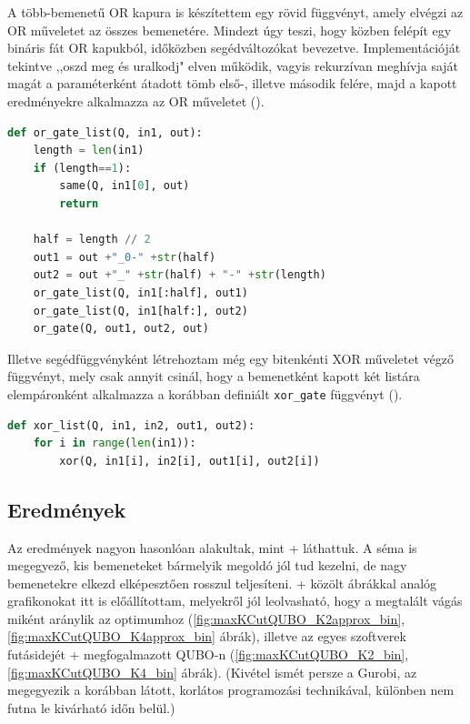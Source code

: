 A több-bemenetű OR kapura is készítettem egy rövid függvényt, amely elvégzi az OR műveletet az összes bemenetére. Mindezt úgy teszi, hogy közben felépít egy bináris fát OR kapukból, időközben segédváltozókat bevezetve. Implementációját tekintve ,,oszd meg és uralkodj" elven működik, vagyis rekurzívan meghívja saját magát a paraméterként átadott tömb első-, illetve második felére, majd a kapott eredményekre alkalmazza az OR műveletet ().

\vspace{5pt}
\begin{lstlisting}[language=python,caption=Sokbemenetes OR kapu,label=code:MultipleOrGates]	
def or_gate_list(Q, in1, out):
	length = len(in1)
	if (length==1):
		same(Q, in1[0], out)
		return
	
	half = length // 2
	out1 = out +"_0-" +str(half)  
	out2 = out +"_" +str(half) + "-" +str(length)
	or_gate_list(Q, in1[:half], out1)
	or_gate_list(Q, in1[half:], out2)
	or_gate(Q, out1, out2, out)	
\end{lstlisting}

Illetve segédfüggvényként létrehoztam még egy bitenkénti XOR műveletet végző függvényt, mely csak annyit csinál, hogy a bemenetként kapott két listára elempáronként alkalmazza a korábban definiált \verb+xor_gate+ függvényt ().

\vspace{5pt}
\begin{lstlisting}[language=python,caption=Bitenkénti XOR művelet,label=code:XorGateList]	
def xor_list(Q, in1, in2, out1, out2):
	for i in range(len(in1)):
		xor(Q, in1[i], in2[i], out1[i], out2[i])	
\end{lstlisting}

\subsection{Eredmények}

Az eredmények nagyon hasonlóan alakultak, mint \az+ láthattuk. A séma is megegyező, kis bemeneteket bármelyik megoldó jól tud kezelni, de nagy bemenetekre elkezd elképesztően rosszul teljesíteni. \Az+ közölt ábrákkal analóg grafikonokat itt is előállítottam, melyekről jól leolvasható, hogy a megtalált vágás miként aránylik az optimumhoz (\ref{fig:maxKCutQUBO_K2approx_bin}, \ref{fig:maxKCutQUBO_K4approx_bin} ábrák), illetve az egyes szoftverek futásidejét \az+ megfogalmazott QUBO-n (\ref{fig:maxKCutQUBO_K2_bin}, \ref{fig:maxKCutQUBO_K4_bin} ábrák). (Kivétel ismét persze a Gurobi, az megegyezik a korábban látott, korlátos programozási technikával, különben nem futna le kivárható időn belül.)

